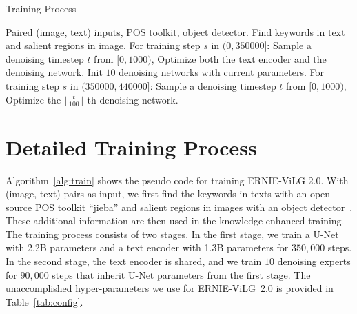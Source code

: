 \documentclass[10pt,twocolumn,letterpaper]{article}
\begin{document}
\newpage

\appendix










\begin{algorithm}[t]
\footnotesize
\caption{Training Process}\label{alg:train}
\begin{algorithmic}[1]
\Require Paired (image, text) inputs, POS toolkit, object detector.
\State Find keywords in text and salient regions in image. 
\State For training step $s$ in $(0, 350000]$: 
\State \quad Sample a denoising timestep $t$ from $[0, 1000)$,
\State \quad Optimize both the text encoder and the denoising network.
\State Init $10$ denoising networks with current parameters.
\State For training step $s$ in $(350000, 440000]$: 
\State \quad Sample a denoising timestep $t$ from $[0, 1000)$,
\State \quad Optimize the $\lfloor \frac{t}{100} \rfloor$-th denoising network.
\end{algorithmic}
\end{algorithm}


\section{Detailed Training Process}\label{sec:training}

Algorithm~\ref{alg:train} shows the pseudo code for training ERNIE-ViLG 2.0.
With (image, text) pairs as input, we first find the keywords in texts with an open-source POS toolkit ``jieba'' and salient regions in images with an object detector~\cite{DBLP:conf/cvpr/00010BT0GZ18}. These additional information are then used in the knowledge-enhanced training.
The training process consists of two stages. In the first stage, we train a U-Net with 2.2B parameters and a text encoder with 1.3B parameters for $350,000$ steps. In the second stage, the text encoder is shared, and we train $10$ denoising experts for $90,000$ steps that inherit U-Net parameters from the first stage.
The unaccomplished hyper-parameters we use for ERNIE-ViLG~2.0 is provided in Table~\ref{tab:config}.
\end{document}
